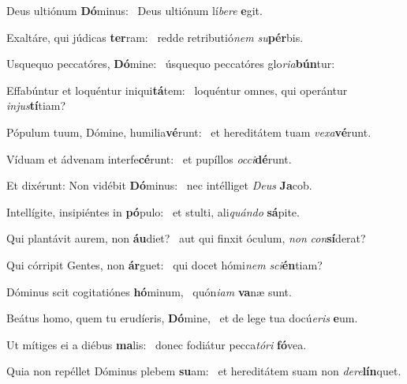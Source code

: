 \item Deus ultiónum \textbf{Dó}minus:~\psstar{} Deus ultiónum lí\textit{bere} \textbf{e}git.

\item Exaltáre, qui júdicas \textbf{ter}ram:~\psstar{} redde retributió\textit{nem} \textit{su}\textbf{pér}bis.

\item Usquequo peccatóres, \textbf{Dó}mine:~\psstar{} úsquequo peccatóres glo\textit{ria}\textbf{bún}tur:

\item Effabúntur et loquéntur iniqui\textbf{tá}tem:~\psstar{} loquéntur omnes, qui operántur \textit{injus}\textbf{tí}tiam?

\item Pópulum tuum, Dómine, humilia\textbf{vé}runt:~\psstar{} et hereditátem tuam \textit{vexa}\textbf{vé}runt.

\item Víduam et ádvenam interfe\textbf{cé}runt:~\psstar{} et pupíllos \textit{occi}\textbf{dé}runt.

\item Et dixérunt: Non vidébit \textbf{Dó}minus:~\psstar{} nec intélliget \textit{Deus} \textbf{Ja}cob.

\item Intellígite, insipiéntes in \textbf{pó}pulo:~\psstar{} et stulti, ali\textit{quándo} \textbf{sá}pite.

\item Qui plantávit aurem, non \textbf{áu}diet?~\psstar{} aut qui finxit óculum, \textit{non} \textit{con}\textbf{sí}derat?

\item Qui córripit Gentes, non \textbf{ár}guet:~\psstar{} qui docet hómi\textit{nem} \textit{sci}\textbf{én}tiam?

\item Dóminus scit cogitatiónes \textbf{hó}minum,~\psstar{} quón\textit{iam} \textbf{va}næ sunt.

\item Beátus homo, quem tu erudíeris, \textbf{Dó}mine,~\psstar{} et de lege tua docú\textit{eris} \textbf{e}um.

\item Ut mítiges ei a diébus \textbf{ma}lis:~\psstar{} donec fodiátur pecca\textit{tóri} \textbf{fó}vea.

\item Quia non repéllet Dóminus plebem \textbf{su}am:~\psstar{} et hereditátem suam non \textit{dere}\textbf{lín}quet.

